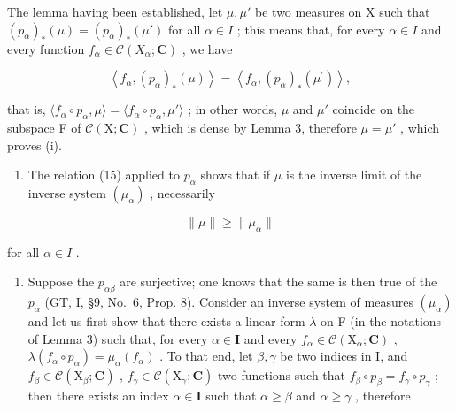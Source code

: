 The lemma having been established, let \(\mu, \mu'\) be two measures on X such that \((p_{\alpha})_{*}(\mu) = (p_{\alpha})_{*}(\mu')\) for all \(\alpha \in I\) ; this means that, for every \(\alpha \in I\) and every function \(f_{\alpha} \in \mathcal{C}(X_{\alpha}; \mathbf{C})\) , we have

\[
\left\langle f _ {\alpha}, \left(p _ {\alpha}\right) _ {*} (\mu) \right\rangle = \left\langle f _ {\alpha}, \left(p _ {\alpha}\right) _ {*} \left(\mu^ {\prime}\right) \right\rangle ,
\]

that is, \(\langle f_{\alpha} \circ p_{\alpha}, \mu \rangle = \langle f_{\alpha} \circ p_{\alpha}, \mu' \rangle\) ; in other words, \(\mu\) and \(\mu'\) coincide on the subspace F of \(\mathcal{C}(\mathrm{X}; \mathbf{C})\) , which is dense by Lemma 3, therefore \(\mu = \mu'\) , which proves (i).

\begin{enumerate}
\def\labelenumi{(\roman{enumi})}
\setcounter{enumi}{1}
\tightlist
\item
  The relation (15) applied to \(p_{\alpha}\) shows that if \(\mu\) is the inverse limit of the inverse system \((\mu_{\alpha})\) , necessarily
\end{enumerate}

\[
\| \mu \| \geqslant \| \mu_ {\alpha} \|\tag{16}
\]

for all \(\alpha \in I\) .

\begin{enumerate}
\def\labelenumi{(\roman{enumi})}
\setcounter{enumi}{2}
\tightlist
\item
  Suppose the \(p_{\alpha \beta}\) are surjective; one knows that the same is then true of the \(p_{\alpha}\) (GT, I, §9, No.~6, Prop. 8). Consider an inverse system of measures \((\mu_{\alpha})\) and let us first show that there exists a linear form \(\lambda\) on F (in the notations of Lemma 3) such that, for every \(\alpha \in \mathbf{I}\) and every \(f_{\alpha} \in \mathcal{C}(\mathrm{X}_{\alpha}; \mathbf{C})\) , \(\lambda(f_{\alpha} \circ p_{\alpha}) = \mu_{\alpha}(f_{\alpha})\) . To that end, let \(\beta, \gamma\) be two indices in I, and \(f_{\beta} \in \mathcal{C}(\mathrm{X}_{\beta}; \mathbf{C})\) , \(f_{\gamma} \in \mathcal{C}(\mathrm{X}_{\gamma}; \mathbf{C})\) two functions such that \(f_{\beta} \circ p_{\beta} = f_{\gamma} \circ p_{\gamma}\) ; then there exists an index \(\alpha \in \mathbf{I}\) such that \(\alpha \geqslant \beta\) and \(\alpha \geqslant \gamma\) , therefore
\end{enumerate}

